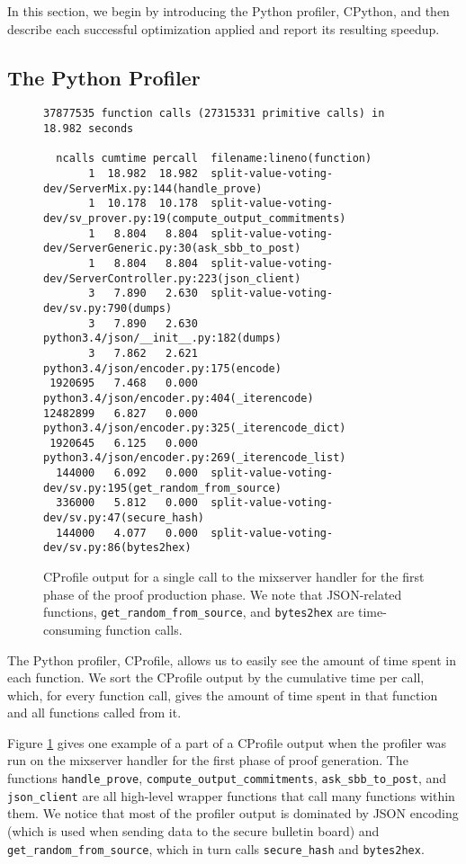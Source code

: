 In this section, we begin by introducing the Python profiler, CPython, and then describe each successful optimization applied and report its resulting speedup.

\subsection{The Python Profiler} \label{perf:optimizations:profiler}

\begin{figure}[htbp]
\begin{lstlisting}[style=base]
37877535 function calls (27315331 primitive calls) in 18.982 seconds

  ncalls cumtime percall  filename:lineno(function)
       1  18.982  18.982  split-value-voting-dev/ServerMix.py:144(handle_prove)
       1  10.178  10.178  split-value-voting-dev/sv_prover.py:19(compute_output_commitments)
       1   8.804   8.804  split-value-voting-dev/ServerGeneric.py:30(ask_sbb_to_post)
       1   8.804   8.804  split-value-voting-dev/ServerController.py:223(json_client)
       3   7.890   2.630  split-value-voting-dev/sv.py:790(dumps)
       3   7.890   2.630  python3.4/json/__init__.py:182(dumps)
       3   7.862   2.621  python3.4/json/encoder.py:175(encode)
 1920695   7.468   0.000  python3.4/json/encoder.py:404(_iterencode)
12482899   6.827   0.000  python3.4/json/encoder.py:325(_iterencode_dict)
 1920645   6.125   0.000  python3.4/json/encoder.py:269(_iterencode_list)
  144000   6.092   0.000  split-value-voting-dev/sv.py:195(get_random_from_source)
  336000   5.812   0.000  split-value-voting-dev/sv.py:47(secure_hash)
  144000   4.077   0.000  split-value-voting-dev/sv.py:86(bytes2hex)
\end{lstlisting}
\caption[CProfile output for a single call to a mixserver handler]{CProfile output for a single call to the mixserver handler for the first phase of the proof production phase. We note that JSON-related functions, \texttt{get\_random\_from\_source}, and \texttt{bytes2hex} are time-consuming function calls.}
\label{figure:perf:optimizations:profiler}
\end{figure}

The Python profiler, CProfile, allows us to easily see the amount of time spent in each function. We sort the CProfile output by the cumulative time per call, which, for every function call, gives the amount of time spent in that function and all functions called from it.

Figure \ref{figure:perf:optimizations:profiler} gives one example of a part of a CProfile output when the profiler was run on the mixserver handler for the first phase of proof generation. The functions \texttt{handle\_prove}, \texttt{compute\_output\_commitments}, \texttt{ask\_sbb\_to\_post}, and \texttt{json\_client} are all high-level wrapper functions that call many functions within them. We notice that most of the profiler output is dominated by JSON encoding (which is used when sending data to the secure bulletin board) and \texttt{get\_random\_from\_source}, which in turn calls \texttt{secure\_hash} and \texttt{bytes2hex}.

